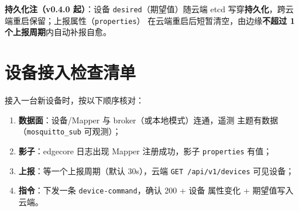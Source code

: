 \textbf{持久化注（v0.4.0 起）}：设备 \texttt{desired}（期望值）随云端
etcd 写穿\textbf{持久化}，跨云端重启保留；上报属性（\texttt{properties}）
在云端重启后短暂清空，由边缘\textbf{不超过 1 个上报周期}内自动补报自愈。

\section{设备接入检查清单}

接入一台新设备时，按以下顺序核对：

\begin{enumerate}
  \item \textbf{数据面}：设备/Mapper 与 broker（或本地模式）连通，遥测
        主题有数据（\texttt{mosquitto\_sub} 可观测）；
  \item \textbf{影子}：edgecore 日志出现 Mapper 注册成功，影子
        \texttt{properties} 有值；
  \item \textbf{上报}：等一个上报周期（默认 30s），云端
        \texttt{GET /api/v1/devices} 可见设备；
  \item \textbf{指令}：下发一条 \texttt{device-command}，确认 200 + 设备
        属性变化 + 期望值写入云端。
\end{enumerate}
